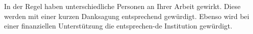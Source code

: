 In der Regel haben unterschiedliche Personen an Ihrer Arbeit gewirkt. Diese werden mit einer kurzen Danksagung entsprechend gewürdigt. Ebenso wird bei einer finanziellen Unterstützung die entsprechen-de Institution gewürdigt.